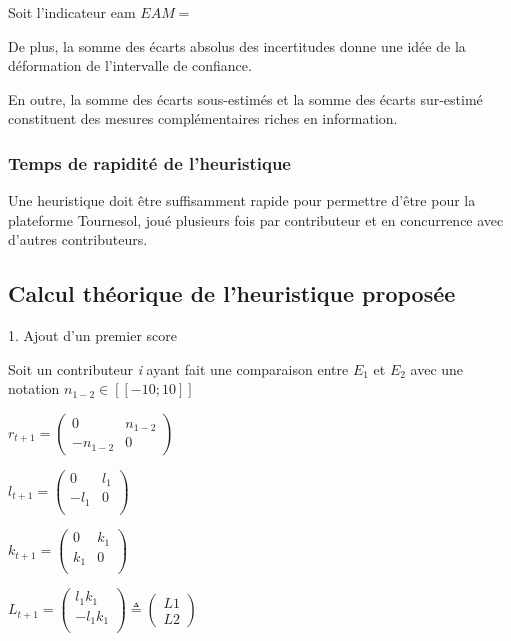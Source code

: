 Soit l'indicateur \gls{eam}
$EAM=$


De plus, la somme des écarts absolus des incertitudes donne une idée de la déformation de l'intervalle de confiance.


En outre, la somme des écarts sous-estimés et la somme des écarts sur-estimé constituent des mesures complémentaires riches en information.

\subsubsection{Temps de rapidité de l'heuristique}

Une heuristique doit être suffisamment rapide pour permettre d'être pour la plateforme Tournesol, joué plusieurs fois par contributeur et en concurrence avec d'autres contributeurs.


\subsection{Calcul théorique de l'heuristique proposée}

1. Ajout d'un premier score 

Soit un contributeur \textit{i} ayant fait une comparaison entre $E_{1}$ et $E_{2}$ avec une notation $n_{1-2} \in [\![-10;10]\!]$

$r_{t+1}= \begin{pmatrix}
0 & n_{1-2} \\
-n_{1-2} & 0 
\end{pmatrix}$

$l_{t+1}= \begin{pmatrix}
0 & l_1 \\
-l_1 & 0 \\
\end{pmatrix}
$

$k_{t+1}= \begin{pmatrix}
0 & k_1 \\
k_1 & 0 \\
\end{pmatrix}
$


$L_{t+1}= \begin{pmatrix}
l_1 k_1\\
-l_1 k_1 \\
\end{pmatrix} \triangleq
\begin{pmatrix}
L1\\
L2
\end{pmatrix} 
$

